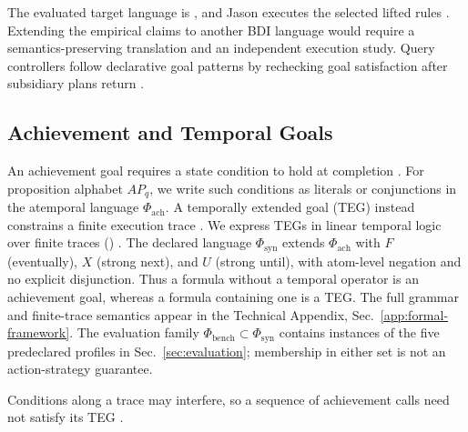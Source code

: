 The evaluated target language is \asl{}, and Jason executes the selected lifted
rules \cite{Bordini2007Jason}. Extending the empirical claims to another BDI
language would require a semantics-preserving translation and an independent
execution study. Query controllers follow declarative goal patterns by
rechecking goal satisfaction after subsidiary plans return
\cite{Hubner2006DeclarativeGoals}.

\subsection{Achievement and Temporal Goals}

An achievement goal requires a state condition to hold at completion
\cite{Rao1996AgentSpeak,Sardina2007PlanFailure}. For proposition alphabet
$AP_q$, we write such conditions as literals or conjunctions in the atemporal
language $\Phi_{\mathrm{ach}}$. A temporally extended goal (TEG) instead
constrains a finite execution trace \cite{Hindriks2009TemporalGoals}. We express
TEGs in linear temporal logic over finite traces (\ltlf{})
\cite{DeGiacomoVardi2013}. The declared language $\Phi_{\mathrm{syn}}$ extends
$\Phi_{\mathrm{ach}}$ with $F$ (eventually), $X$ (strong next), and $U$ (strong
until), with atom-level negation and no explicit disjunction. Thus a formula
without a temporal operator is an achievement goal, whereas a formula containing
one is a TEG.
The full grammar and finite-trace semantics appear in the Technical Appendix,
Sec.~\ref{app:formal-framework}. The evaluation family
$\Phi_{\mathrm{bench}}\subset\Phi_{\mathrm{syn}}$ contains instances of the
five predeclared profiles in Sec.~\ref{sec:evaluation}; membership in either
set is not an action-strategy guarantee.

Conditions along a trace may interfere, so a sequence of achievement calls need
not satisfy its TEG \cite{Thangarajah2003GoalInterference}.

